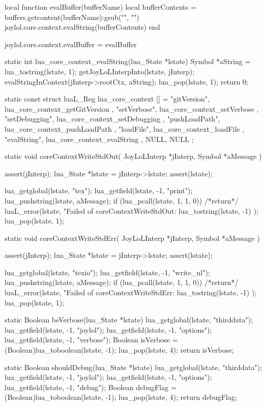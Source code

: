 \startLuaCode
local function evalBuffer(bufferName) 
  local bufferContents =
    buffers.getcontent(bufferName):gsub("", "\n")
  joylol.core.context.evalString(bufferContents)
end

joylol.core.context.evalBuffer = evalBuffer
\stopLuaCode

\startCCode
static int lua_core_context_evalString(lua_State *lstate) {
  Symbol *aString = lua_tostring(lstate, 1);
  getJoyLoLInterpInto(lstate, jInterp);
  evalStringInContext(jInterp->rootCtx, aString);
  lua_pop(lstate, 1);
  return 0;
}
\stopCCode

\startCCode
static const struct luaL_Reg lua_core_context [] = {
  { "gitVersion",   lua_core_context_getGitVersion },
  { "setVerbose",   lua_core_context_setVerbose    },
  { "setDebugging", lua_core_context_setDebugging  },
  { "pushLoadPath", lua_core_context_pushLoadPath  },
  { "loadFile",     lua_core_context_loadFile      },
  { "evalString",   lua_core_context_evalString    },
  {NULL, NULL}
};
\stopCCode

\startCCode
static void coreContextWriteStdOut(
  JoyLoLInterp *jInterp,
  Symbol       *aMessage
) {
  assert(jInterp);
  lua_State *lstate = jInterp->lstate;
  assert(lstate);
  
  lua_getglobal(lstate, "tex");
  lua_getfield(lstate, -1, "print");
  lua_pushstring(lstate, aMessage);
  if (lua_pcall(lstate, 1, 1, 0)) {
    /*return*/ luaL_error(lstate,
      "Failed of coreContextWriteStdOut\nERROR:\n%
      lua_tostring(lstate, -1)
    );
  }
  lua_pop(lstate, 1);
}

static void coreContextWriteStdErr(
  JoyLoLInterp *jInterp,
  Symbol       *aMessage
) {
  assert(jInterp);
  lua_State *lstate = jInterp->lstate;
  assert(lstate);
  
  lua_getglobal(lstate, "texio");
  lua_getfield(lstate, -1, "write_nl");
  lua_pushstring(lstate, aMessage);
  if (lua_pcall(lstate, 1, 1, 0)) {
    /*return*/ luaL_error(lstate,
      "Failed of coreContextWriteStdErr\nERROR:\n%
      lua_tostring(lstate, -1)
    );
  }
  lua_pop(lstate, 1);
}

static Boolean beVerbose(lua_State *lstate) {
  lua_getglobal(lstate, "thirddata");
  lua_getfield(lstate, -1, "joylol");
  lua_getfield(lstate, -1, "options");
  lua_getfield(lstate, -1, "verbose");
  Boolean isVerbose = (Boolean)lua_toboolean(lstate, -1);
  lua_pop(lstate, 4);
  return isVerbose;
}

static Boolean shouldDebug(lua_State *lstate) {
  lua_getglobal(lstate, "thirddata");
  lua_getfield(lstate, -1, "joylol");
  lua_getfield(lstate, -1, "options");
  lua_getfield(lstate, -1, "debug");
  Boolean debugFlag = (Boolean)lua_toboolean(lstate, -1);
  lua_pop(lstate, 4);
  return debugFlag;
}

